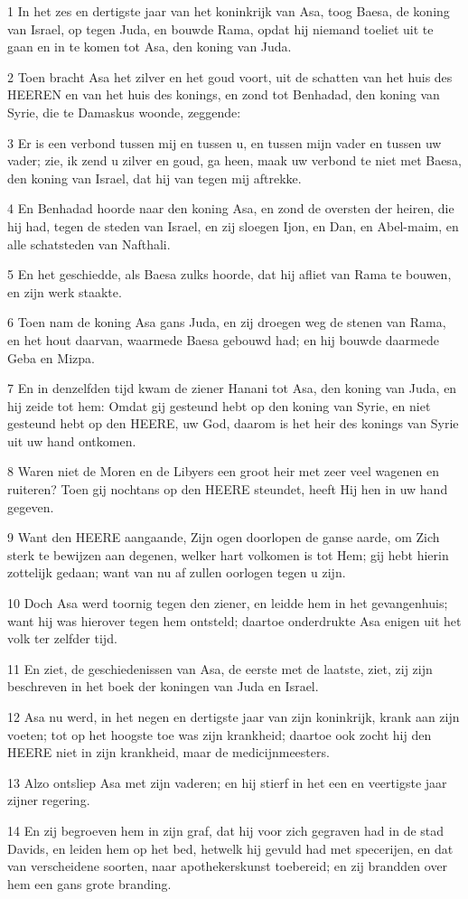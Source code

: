\par 1 In het zes en dertigste jaar van het koninkrijk van Asa, toog Baesa, de koning van Israel, op tegen Juda, en bouwde Rama, opdat hij niemand toeliet uit te gaan en in te komen tot Asa, den koning van Juda.
\par 2 Toen bracht Asa het zilver en het goud voort, uit de schatten van het huis des HEEREN en van het huis des konings, en zond tot Benhadad, den koning van Syrie, die te Damaskus woonde, zeggende:
\par 3 Er is een verbond tussen mij en tussen u, en tussen mijn vader en tussen uw vader; zie, ik zend u zilver en goud, ga heen, maak uw verbond te niet met Baesa, den koning van Israel, dat hij van tegen mij aftrekke.
\par 4 En Benhadad hoorde naar den koning Asa, en zond de oversten der heiren, die hij had, tegen de steden van Israel, en zij sloegen Ijon, en Dan, en Abel-maim, en alle schatsteden van Nafthali.
\par 5 En het geschiedde, als Baesa zulks hoorde, dat hij afliet van Rama te bouwen, en zijn werk staakte.
\par 6 Toen nam de koning Asa gans Juda, en zij droegen weg de stenen van Rama, en het hout daarvan, waarmede Baesa gebouwd had; en hij bouwde daarmede Geba en Mizpa.
\par 7 En in denzelfden tijd kwam de ziener Hanani tot Asa, den koning van Juda, en hij zeide tot hem: Omdat gij gesteund hebt op den koning van Syrie, en niet gesteund hebt op den HEERE, uw God, daarom is het heir des konings van Syrie uit uw hand ontkomen.
\par 8 Waren niet de Moren en de Libyers een groot heir met zeer veel wagenen en ruiteren? Toen gij nochtans op den HEERE steundet, heeft Hij hen in uw hand gegeven.
\par 9 Want den HEERE aangaande, Zijn ogen doorlopen de ganse aarde, om Zich sterk te bewijzen aan degenen, welker hart volkomen is tot Hem; gij hebt hierin zottelijk gedaan; want van nu af zullen oorlogen tegen u zijn.
\par 10 Doch Asa werd toornig tegen den ziener, en leidde hem in het gevangenhuis; want hij was hierover tegen hem ontsteld; daartoe onderdrukte Asa enigen uit het volk ter zelfder tijd.
\par 11 En ziet, de geschiedenissen van Asa, de eerste met de laatste, ziet, zij zijn beschreven in het boek der koningen van Juda en Israel.
\par 12 Asa nu werd, in het negen en dertigste jaar van zijn koninkrijk, krank aan zijn voeten; tot op het hoogste toe was zijn krankheid; daartoe ook zocht hij den HEERE niet in zijn krankheid, maar de medicijnmeesters.
\par 13 Alzo ontsliep Asa met zijn vaderen; en hij stierf in het een en veertigste jaar zijner regering.
\par 14 En zij begroeven hem in zijn graf, dat hij voor zich gegraven had in de stad Davids, en leiden hem op het bed, hetwelk hij gevuld had met specerijen, en dat van verscheidene soorten, naar apothekerskunst toebereid; en zij brandden over hem een gans grote branding.

